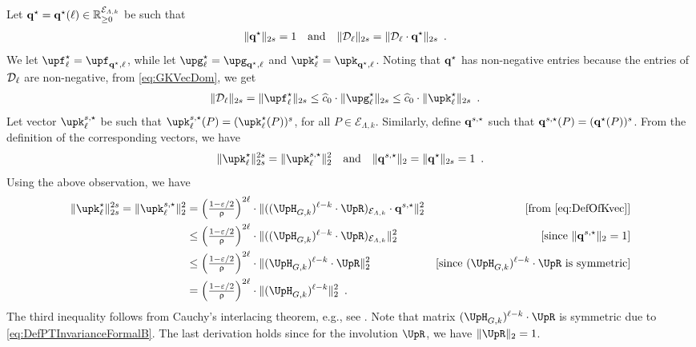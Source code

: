 \documentclass[11pt,reqno]{amsart}
\numberwithin{equation}{section}
\newcommand{\cE}{{\mathcal{E}}}
\newcommand{\applegreen}[1]{ {\color{applegreen}#1}}
\newcommand{\bluepigment}[1]{{\color{blue(pigment)}#1}}
\newcommand{\cadmiumgreen}[1]{{\color{cadmiumgreen}#1}}
\newcommand{\darkmagenta}[1]{{\color{darkmagenta}#1}}
\newcommand{\goldenbrown}[1]{{\color{goldenbrown}#1}}
\newcommand{\iris}[1]{{\color{iris}#1}}
\newcommand{\ExtV}{\iris{\cE}}
\newcommand{\pfs}{\darkmagenta{s}}
\newcommand{\norm}[2]{\goldenbrown{\|} #1 \goldenbrown{\|}_{#2}}
\newcommand{\nnorm}[3]{\goldenbrown{\|} #1\goldenbrown{\|}^{#2}_{#3}}
\newcommand{\NBMatrix}{\cadmiumgreen{\UpH}_{G,\kk}}
\newcommand{\Invol}{\UpR}
\renewcommand{\applegreen}[1]{#1}
\renewcommand{\bluepigment}[1]{#1}
\renewcommand{\cadmiumgreen}[1]{#1}
\renewcommand{\darkmagenta}[1]{#1}
\renewcommand{\goldenbrown}[1]{#1}
\renewcommand{\iris}[1]{#1}
\newcommand{\kk}{\bluepigment{k}}
\newcommand{\kell}{{\color{green(pigment)}\ell}}%
\newcommand{\kP}{\goldenbrown{P}}
\renewcommand{\kk}{k}
\renewcommand{\kell}{\ell}
\renewcommand{\kP}{P}
\newcommand{\SingBound}{\uprho}
\begin{document}
Let $\vtest^{\star}=\vtest^{\star}(\kell) \in \mathbb{R}^{\ExtV_{\Lambda,\kk}}_{\geq 0}$ be 
 such that 
\begin{align}\label{eq:Norm2sYLVsKStar}
\norm{ \vtest^{\star}}{2\pfs}&=1& \textrm{and} &&
\norm{\ExtdInfMatrixL_{\kell}}{2\pfs}&=\norm{ \ExtdInfMatrixL_{\kell}\cdot \vtest^{\star}}{2\pfs} \enspace.
\end{align}
We let $\vecF^{\star}_{\kell}=\vecF_{\vtest^{\star}, \kell}$, while let $\vecG^{\star}_{\kell}=\vecG_{\vtest^{\star}, \kell}$ and 
 $\vecK^{\star}_{\kell}=\vecK_{\vtest^{\star}, \kell}$. 
%
Noting that $\vtest^{\star}$ has non-negative entries because the entries of $\ExtdInfMatrixL_{\kell}$ are non-negative, 
%
from \eqref{eq:GKVecDom}, we get
\begin{align}\label{eq:KSNorm4L1}
\norm{ \ExtdInfMatrixL_{\kell}}{2\pfs}&=\norm{ \vecF^{\star}_{\kell}}{2\pfs} \leq 
\widehat{c}_0 \cdot \norm{ \vecG^{\star}_{\kell}}{2\pfs} \leq \widehat{c}_0 \cdot \norm{ \vecK^{\star}_{\kell}}{2\pfs} \enspace. 
\end{align}
Let vector $\vecK^{\pfs,\star}_{\kell}$ be such that $\vecK^{\pfs,\star}_{\kell}(\kP)=({\vecK}^{\star}_{\kell}(\kP))^{\pfs}$, 
for all $\kP\in \ExtV_{\Lambda,\kk}$. Similarly, define $\vtest^{\pfs,\star}$ such that $\vtest^{\pfs,\star}(\kP)=({\vtest}^{\star}(\kP))^{\pfs}$. 
%
From the definition of the corresponding vectors, we have  
\begin{align}\label{eq:KstarL2sVsBarKStarL2}
\nnorm{ \vecK^{\star}_{\kell}}{2\pfs}{2\pfs}&=\nnorm{ \vecK^{\pfs,\star}_{\kell}}{2}{2}&
\textrm{and} && 
\norm{ \vtest^{\pfs,\star}}{2}=\norm{ \vtest^{\star}}{2\pfs}=1
\enspace. 
\end{align}
% 
Using the above observation,  we have
\begin{align}
\nnorm{ \vecK^{\star}_{\kell}}{2\pfs}{2\pfs}=\nnorm{ \vecK^{\pfs,\star}_{\kell}}{2}{2} &=
 {\textstyle \left(\frac{1-\varepsilon/2}{\SingBound}\right)^{2\kell}} \cdot %
\nnorm{   ( ( \NBMatrix)^{{\kell-\kk}}\cdot \Invol )_{\ExtV_{\Lambda,\kk}} \cdot \vtest^{\pfs, \star}  }{2}{2} 
 &\textrm{[from \eqref{eq:DefOfKvec}]}\nonumber \\
 &\leq {\textstyle \left(\frac{1-\varepsilon/2}{\SingBound}\right)^{2\kell}} \cdot %
 \nnorm{ {\textstyle ( ( \NBMatrix)^{{\kell-\kk}}\cdot \Invol )_{\ExtV_{\Lambda, \kk}}}}{2}{2} &
 \textrm{[since $\norm{ \vtest^{\pfs,\star}}{2}=1$]}\nonumber \\
&\leq {\textstyle \left(\frac{1-\varepsilon/2}{\SingBound}\right)^{2 \kell}} \cdot %
\nnorm{ ( \NBMatrix)^{{\kell-\kk}}\cdot \Invol }{2}{2} & \textrm{[since $(\NBMatrix)^{\kell-\kk}\cdot \Invol$ is symmetric]} \nonumber \\
&= {\textstyle \left(\frac{1-\varepsilon/2}{\SingBound}\right)^{2\kell}} \cdot
\nnorm{ ( \NBMatrix)^{{\kell-\kk}}}{2}{2}
\enspace. \label{eq:VevKStarNormBound}
\end{align}
The third inequality follows from Cauchy’s interlacing theorem, e.g., see \cite{MatrixAnalysis}.
Note that   matrix $(\NBMatrix)^{\kell-\kk} \cdot \Invol$ is symmetric  due to \eqref{eq:DefPTInvarianceFormalB}.
%
The last derivation holds since for the involution $ \Invol$, we have $\norm{ \Invol}{2}=1$. 
\end{document}
